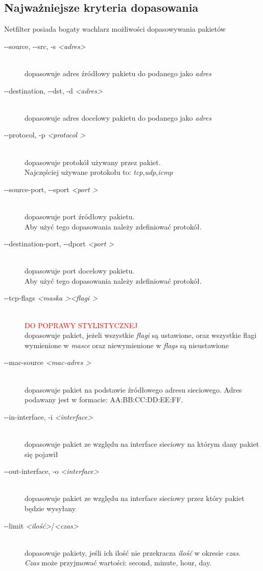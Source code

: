 \documentclass[a4paper,12pt]{book}
\newcommand{\param}[1]{\textit{\textless #1\textgreater}}
\begin{document}
		\subsection{Najważniejsze kryteria dopasowania}
			Netfilter posiada bogaty wachlarz możliwości dopasowywania pakietów
			\begin{description}
				\item[-{}-source, -{}-src, -s \param{adres} ] \hfill \\
					dopasowuje adres źródłowy pakietu do podanego jako \textit{adres}
				\item[-{}-destination, -{}-dst, -d \param{adres}] \hfill\\
					dopasowuje adres docelowy pakietu do podanego jako \textit{adres}
				\item[-{}-protocol, -p \textit{\textless protocol \textgreater}] \hfill \\
					dopasowuje protokół używany przez pakiet.\\
					Najczęściej używane protokołu to: \textit{tcp},\textit{udp},\textit{icmp}
				\item[-{}-source-port, -{}-sport \textit{\textless port \textgreater} ]\hfill\\
					dopasowuje port źródłowy pakietu.\\
					Aby użyć tego dopasowania należy zdefiniować protokół.
				\item[-{}-destination-port, -{}-dport \textit{\textless port \textgreater}] \hfill \\
					dopasowuje port docelowy pakietu.\\
					Aby użyć tego dopasowania należy zdefiniować protokół.
				\item[-{}-tcp-flags \textit{\textless maska \textgreater \textless flagi \textgreater}] \hfill \\
					\textcolor{red}{\Large{DO POPRAWY STYLISTYCZNEJ}}\\
					dopasowuje pakiet, jeżeli wszystkie \textit{flagi} są ustawione, oraz wszystkie flagi wymienione w \textit{masce} oraz niewymienione w \textit{flags} są nieustawione
				\item[-{}-mac-source \textit{\textless mac-adres \textgreater}] \hfill \\
					dopasowuje pakiet na podstawie źródłowego adresu sieciowego. Adres podawany jest w formacie: AA:BB:CC:DD:EE:FF.
				\item[-{}-in-interface, -i \param{interface}] \hfill \\
					dopasowuje pakiet ze względu na interface sieciowy na którym dany pakiet się pojawił	
				\item[-{}-out-interface, -o \param{interface}] \hfill \\
					dopasowuje pakiet ze względu na interface sieciowy przez który pakiet będzie wysyłany
				\item[-{}-limit \param{ilość}/\param{czas}] \hfill \\
					dopasowuje pakiety, jeśli ich ilość nie przekracza \textit{ilość} w okresie \textit{czas}.\\
					\textit{Czas} może przyjmować wartości: second, minute, hour, day.
			\end{description}
\end{document}
